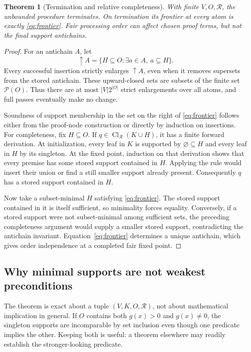 \documentclass[11pt,a4paper]{article}
\newcommand{\Cl}{\operatorname{Cl}}
\newtheorem{theorem}{Theorem}[section]
\theoremstyle{definition}
\theoremstyle{remark}
\begin{document}
\begin{theorem}[Termination and relative completeness]\label{thm:complete}
With finite $V,O,\mathcal R$, the unbounded procedure terminates. On termination its frontier at every atom is exactly \eqref{eq:frontier}. Fair processing order can affect chosen proof terms, but not the final support antichains.
\end{theorem}
\begin{proof}
For an antichain $A$, let
\[
 \uparrow A=\{H\subseteq O:\exists a\in A,\ a\subseteq H\}.
\]
Every successful insertion strictly enlarges $\uparrow A$, even when it removes supersets from the stored antichain. These upward-closed sets are subsets of the finite set $\mathcal P(O)$. Thus there are at most $|V|2^{|O|}$ strict enlargements over all atoms, and full passes eventually make no change.

Soundness of support membership in the set on the right of \eqref{eq:frontier} follows either from the proof-node construction or directly by induction on insertions. For completeness, fix $H\subseteq O$. If $q\in\Cl_{\mathcal R}(K\cup H)$, it has a finite forward derivation. At initialization, every leaf in $K$ is supported by $\varnothing\subseteq H$ and every leaf in $H$ by its singleton. At the fixed point, induction on that derivation shows that every premise has some stored support contained in $H$. Applying the rule would insert their union or find a still smaller support already present. Consequently $q$ has a stored support contained in $H$.

Now take a subset-minimal $H$ satisfying \eqref{eq:frontier}. The stored support contained in it is itself sufficient, so minimality forces equality. Conversely, if a stored support were not subset-minimal among sufficient sets, the preceding completeness argument would supply a smaller stored support, contradicting the antichain invariant. Equation~\eqref{eq:frontier} determines a unique antichain, which gives order independence at a completed fair fixed point.
\end{proof}

\subsection{Why minimal supports are not weakest preconditions}
The theorem is exact about a tuple $(V,K,O,\mathcal R)$, not about mathematical implication in general. If $O$ contains both $g(x)>0$ and $g(x)\ne0$, the singleton supports are incomparable by set inclusion even though one predicate implies the other. Keeping both is useful: a theorem elsewhere may readily establish the stronger-looking predicate.
\end{document}
